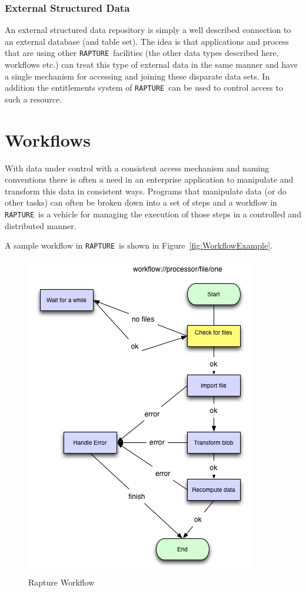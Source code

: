 \documentclass[12pt,twoside,a4paper]{book}
\newcommand{\Rapture}{\Verb+RAPTURE+~}
\begin{document}
\subsubsection{External Structured Data}

An external structured data repository is simply a well described connection to an external database (and table set). The idea
is that applications and process that are using other \Rapture facilities (the other data types described here, workflows etc.) can
treat this type of external data in the same manner and have a single mechanism for accessing and joining these disparate data sets. In addition
the entitlements system of \Rapture can be used to control access to such a resource.

\section{Workflows}

With data under control with a consistent access mechanism and naming conventions there is often a need in an enterprise application to
manipulate and transform this data in consistent ways. Programs that manipulate data (or do other tasks) can often be broken down into a set of steps
and a workflow in \Rapture is a vehicle for managing the execution of those steps in a controlled and distributed manner.

A sample workflow in \Rapture is shown in Figure~\vref{fig:WorkflowExample}.

\begin{figure}[H]
\centering
\includegraphics[scale=0.75]{Graphics/RaptureWorkflowExplain}
\caption{Rapture Workflow}
\label{fig:WorkflowExample}
\end{figure}
\end{document}
